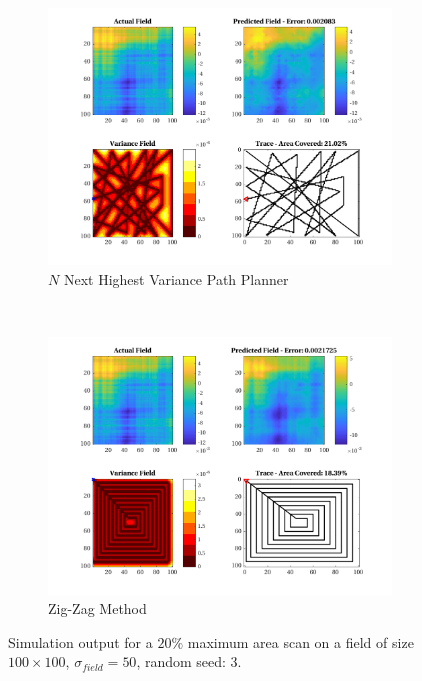 \begin{figure}[htb!]
\begin{subfigure}[t]{0.5\textwidth}
    \end{subfigure}%
    \\
    \begin{subfigure}[t]{0.5\textwidth}
        \centering
        \includegraphics[width=\linewidth]{figures/hbresults/nnhv_20p_100x100_sf_50_seed_3.png}
        \captionsetup{skip=0.10\baselineskip,size=footnotesize}
        \caption{$N$ Next Highest Variance Path Planner}
    \end{subfigure}%
    ~
    \begin{subfigure}[t]{0.5\textwidth}
        \centering
        \includegraphics[width=\linewidth]{figures/hbresults/zz_20p_100x100_sf_50_seed_3.png}
        \captionsetup{skip=0.10\baselineskip,size=footnotesize}
        \caption{Zig-Zag Method}
    \end{subfigure}%
    \captionsetup{skip=0.20\baselineskip}
    \caption{Simulation output for a $20\%$ maximum area scan on a field of size $100 \times 100$, $\sigma_{field} = 50$, random seed: 3.}
    \label{fig:sim_sigma50_p20_s3}
\end{figure}

